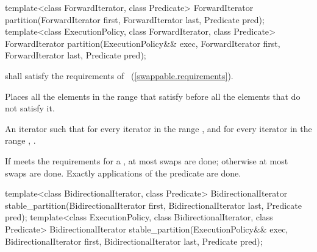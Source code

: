 %
\begin{itemdecl}
template<class ForwardIterator, class Predicate>
  ForwardIterator
    partition(ForwardIterator first, ForwardIterator last, Predicate pred);
template<class ExecutionPolicy, class ForwardIterator, class Predicate>
  ForwardIterator
    partition(ExecutionPolicy&& exec,
              ForwardIterator first, ForwardIterator last, Predicate pred);
\end{itemdecl}

\begin{itemdescr}
\pnum
\requires
{} shall satisfy the requirements of
~(\ref{swappable.requirements}).

\pnum
\effects Places all the elements in the range  that satisfy  before all the elements that do not satisfy it.

\pnum
\returns An iterator  such that for every iterator  in the range
 , and for every iterator  in the
range , .

\pnum
\complexity If  meets the requirements for a , at most
 swaps are done; otherwise at most  swaps
are done. Exactly  applications of the predicate are done.
\end{itemdescr}

%
\begin{itemdecl}
template<class BidirectionalIterator, class Predicate>
  BidirectionalIterator
    stable_partition(BidirectionalIterator first, BidirectionalIterator last,
                     Predicate pred);
template<class ExecutionPolicy, class BidirectionalIterator, class Predicate>
  BidirectionalIterator
    stable_partition(ExecutionPolicy&& exec,
                     BidirectionalIterator first, BidirectionalIterator last,
                     Predicate pred);
\end{itemdecl}

